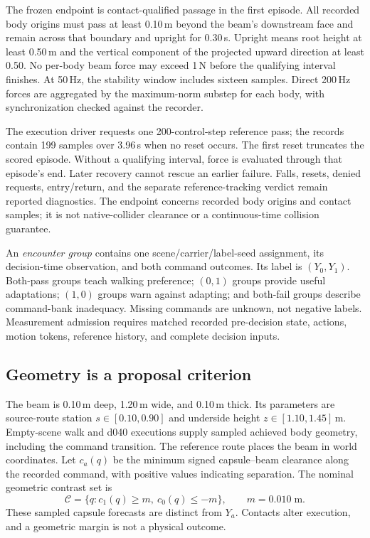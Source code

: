 \documentclass[letterpaper,10pt,conference]{ieeeconf}
\begin{document}
The frozen endpoint is contact-qualified passage in the first episode. All
recorded body origins must pass at least 0.10\,m beyond the beam's downstream
face and remain across that boundary and upright for 0.30\,s. Upright means
root height at least 0.50\,m and the vertical component of the projected
upward direction at least 0.50. No per-body beam force may exceed 1\,N before
the qualifying interval finishes. At 50\,Hz, the stability window includes
sixteen samples. Direct 200\,Hz forces are aggregated by the maximum-norm
substep for each body, with synchronization checked against the recorder.

The execution driver requests one 200-control-step reference pass; the records
contain 199 samples over 3.96\,s when no reset occurs. The first reset truncates
the scored episode. Without a qualifying interval, force is evaluated through
that episode's end. Later recovery cannot rescue an earlier failure. Falls,
resets, denied requests, entry/return, and the separate reference-tracking
verdict remain reported diagnostics. The endpoint concerns recorded body
origins and contact samples; it is not native-collider clearance or a
continuous-time collision guarantee.

An \emph{encounter group} contains one scene/carrier/label-seed assignment,
its decision-time observation, and both command outcomes. Its label is
$(Y_0,Y_1)$. Both-pass groups teach walking preference; $(0,1)$ groups provide
useful adaptations; $(1,0)$ groups warn against adapting; and both-fail groups
describe command-bank inadequacy. Missing commands are unknown, not negative
labels. Measurement admission requires matched recorded pre-decision state,
actions, motion tokens, reference history, and complete decision inputs.

\subsection{Geometry is a proposal criterion}
The beam is 0.10\,m deep, 1.20\,m wide, and 0.10\,m thick. Its parameters are
source-route station $s\in[0.10,0.90]$ and underside height
$z\in[1.10,1.45]$\,m. Empty-scene walk and d040 executions supply sampled
achieved body geometry, including the command transition. The reference route
places the beam in world coordinates. Let $c_a(q)$ be the minimum signed
capsule--beam clearance along the recorded command, with positive values
indicating separation. The nominal geometric contrast set is
\begin{equation}
\mathcal C=\{q:c_1(q)\geq m,\ c_0(q)\leq -m\},\qquad m=0.010\;\mathrm m.
\end{equation}
These sampled capsule forecasts are distinct from $Y_a$. Contacts alter
execution, and a geometric margin is not a physical outcome.
\end{document}
